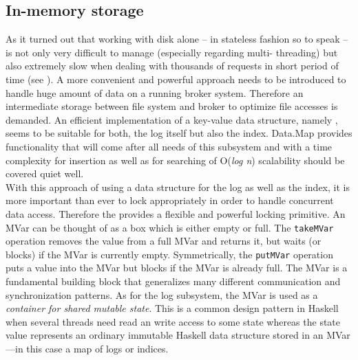 


\subsection{In-memory storage}
\label{subsec:broker-log-inmemory}

As it turned out that working with disk alone -- in stateless fashion so to
speak -- is not only very difficult to manage (especially regarding multi-
threading) but also extremely slow when
dealing with thousands of requests in short period of time (see
). A more convenient and powerful
approach needs to be introduced to handle huge amount of data on a running broker
system. Therefore an intermediate storage between file system and broker to
optimize file accesses is demanded. An efficient implementation of a key-value
data structure, namely
,
seems to be suitable for both, the log itself but also the index. Data.Map
provides functionality that will come after all needs of this subsystem and with
a time complexity for insertion as well as for searching of O(\textit{log n})
scalability should be covered quiet well. \\

With this approach of using a data structure for the log as well as the index,
it is more important than ever to lock appropriately in order to handle
concurrent data access. Therefore the
provides a flexible and powerful locking primitive. An MVar can be thought of as
a box which is either empty or full.  The \lstinline{takeMVar} operation removes
the value from a full MVar and returns it, but waits (or blocks) if the MVar is
currently empty.  Symmetrically, the \lstinline{putMVar} operation puts a value
into the MVar but blocks if the MVar is already full.  The MVar is a fundamental
building block that generalizes many different communication and synchronization
patterns. As for the log subsystem, the MVar is used as a \textit{container for
shared mutable state}. This is a common design pattern in Haskell when several
threads need read an write access to some state whereas the state value
represents an ordinary immutable Haskell data structure stored in an MVar---in
this case a map of logs or indices. \cite{marlow2013parallel}

